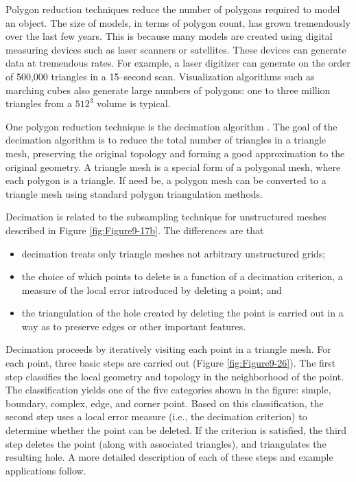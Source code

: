 Polygon reduction techniques reduce the number of polygons required to model an object. The size of models, in terms of polygon count, has grown tremendously over the last few years. This is because many models are created using digital measuring devices such as laser scanners or satellites. These devices can generate data at tremendous rates. For example, a laser digitizer can generate on the order of 500,000 triangles in a 15--second scan. Visualization algorithms such as marching cubes also generate large numbers of polygons: one to three million triangles from a $512^3$ volume is typical.

One polygon reduction technique is the decimation algorithm \cite{Schroeder92a}. The goal of the decimation algorithm is to reduce the total number of triangles in a triangle mesh, preserving the original topology and forming a good approximation to the original geometry. A triangle mesh is a special form of a polygonal mesh, where each polygon is a triangle. If need be, a polygon mesh can be converted to a triangle mesh using standard polygon triangulation methods.

Decimation is related to the subsampling technique for unstructured meshes described in Figure \ref{fig:Figure9-17b}. The differences are that

\begin{itemize}

\item decimation treats only triangle meshes not arbitrary unstructured grids;

\item the choice of which points to delete is a function of a decimation criterion, a measure of the local error introduced by deleting a point; and

\item the triangulation of the hole created by deleting the point is carried out in a way as to preserve edges or other important features.

\end{itemize}

Decimation proceeds by iteratively visiting each point in a triangle mesh. For each point, three basic steps are carried out (Figure \ref{fig:Figure9-26}). The first step classifies the local geometry and topology in the neighborhood of the point. The classification yields one of the five categories shown in the figure: simple, boundary, complex, edge, and corner point. Based on this classification, the second step uses a local error measure (i.e., the decimation criterion) to determine whether the point can be deleted. If the criterion is satisfied, the third step deletes the point (along with associated triangles), and triangulates the resulting hole. A more detailed description of each of these steps and example applications follow.

